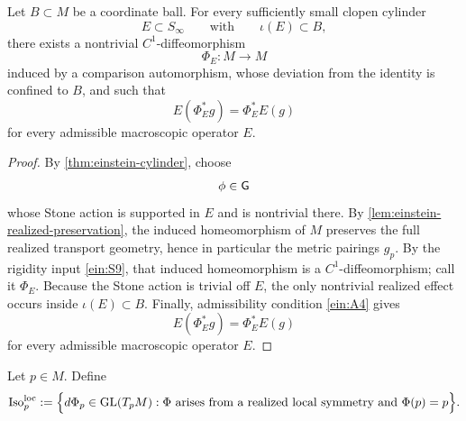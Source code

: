 \begin{theorem}
	\label{thm:einstein-local-realized}
	Let \(B\subset M\) be a coordinate ball.
	For every sufficiently small clopen cylinder
	\[
		E\subset S_\infty
		\qquad\text{with}\qquad
		\iota(E)\subset B,
	\]
	there exists a nontrivial \(C^1\)-diffeomorphism
	\[
		\Phi_E:M\to M
	\]
	induced by a comparison automorphism, whose deviation from the identity
	is confined to \(B\), and such that
	\[
		E(\Phi_E^*g)=\Phi_E^*E(g)
	\]
	for every admissible macroscopic operator \(E\).
\end{theorem}
\begin{proof}
	By \cref{thm:einstein-cylinder}, choose
	\[
		\phi\in\mathsf G
	\]
	whose Stone action is supported in \(E\) and is nontrivial there.
	By \cref{lem:einstein-realized-preservation}, the induced homeomorphism
	of \(M\) preserves the full realized transport geometry, hence in
	particular the metric pairings \(g_p\).
	By the rigidity input \ref{ein:S9}, that induced homeomorphism is a
	\(C^1\)-diffeomorphism; call it \(\Phi_E\).
	Because the Stone action is trivial off \(E\), the only nontrivial
	realized effect occurs inside \(\iota(E)\subset B\).
	Finally, admissibility condition \textup{\ref{ein:A4}} gives
	\[
		E(\Phi_E^*g)=\Phi_E^*E(g)
	\]
	for every admissible macroscopic operator \(E\).
\end{proof}
\begin{definition}
	Let \(p\in M\).
	Define
	\[
		\operatorname{Iso}^{\mathrm{loc}}_p
		:=
		\Bigl\{
		d\Phi_p\in \mathrm{GL}(T_pM):
		\Phi \text{ arises from a realized local symmetry and } \Phi(p)=p
		\Bigr\}.
	\]
\end{definition}
